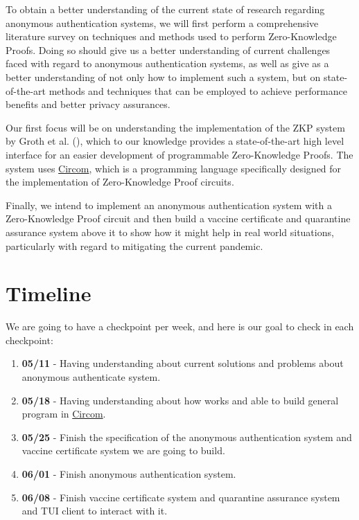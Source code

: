 \documentclass[sigconf, nonacm=true]{acmart}
\begin{document}
To obtain a better understanding of the current state of research regarding anonymous
authentication systems, we will first perform a comprehensive literature survey on techniques and methods used to perform Zero-Knowledge Proofs. Doing so should give us a better understanding of current challenges faced with regard to anonymous authentication systems, as well as give as a better understanding of not only how to implement such a system, but on state-of-the-art methods and techniques that can be employed to achieve performance benefits and better privacy assurances.

Our first focus will be on understanding the implementation of the ZKP system by Groth et al. (\cite{Gro16}), which to our knowledge provides a state-of-the-art high level interface for an easier development of programmable Zero-Knowledge Proofs. The system uses \href{https://github.com/iden3/circom}{Circom}, which is a programming language specifically designed for the implementation of Zero-Knowledge Proof circuits.

Finally, we intend to implement an anonymous authentication system with a Zero-Knowledge Proof circuit
and then build a vaccine certificate and quarantine assurance system above it to show how it might help
in real world situations, particularly with regard to mitigating the current pandemic.

\section{Timeline}
We are going to have a checkpoint per week, and here is our goal to check in
each checkpoint:
\begin{enumerate}
    \item \textbf{05/11} - Having understanding about current solutions and
    problems about anonymous authenticate system.
    \item \textbf{05/18} - Having understanding about how \cite{Gro16} works and
    able to build general program in
    \href{https://github.com/iden3/circom}{Circom}.
    \item \textbf{05/25} - Finish the specification of the anonymous
    authentication system and vaccine certificate system we are going to build.
    \item \textbf{06/01} - Finish anonymous authentication system.
    \item \textbf{06/08} - Finish vaccine certificate system and quarantine assurance system and TUI client to interact with it.
\end{enumerate}
\end{document}
